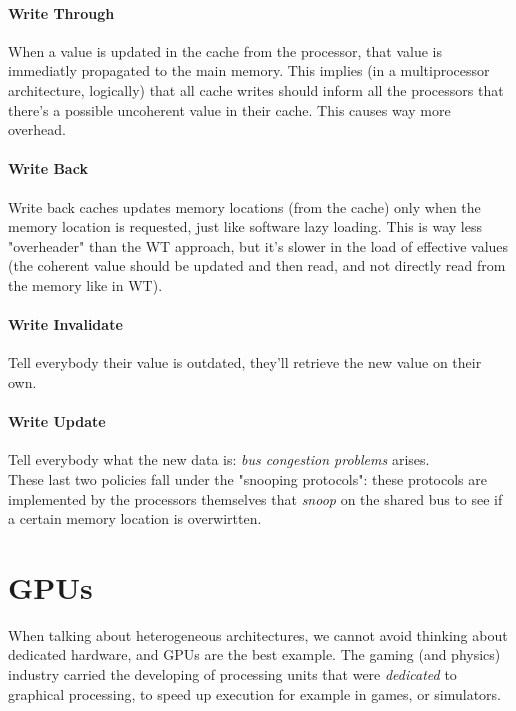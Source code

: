 \documentclass[10pt,a4paper]{article}
\begin{document}
					\paragraph{Write Through}
						When a value is updated in the cache from the processor, that value is immediatly propagated to the main memory. This implies (in a multiprocessor architecture, logically) that all cache writes should inform all the processors that there's a possible uncoherent value in their cache. This causes way more overhead.
						
					\paragraph{Write Back}
						Write back caches updates memory locations (from the cache) only when the memory location is requested, just like software lazy loading. This is way less "overheader" than the WT approach, but it's slower in the load of effective values (the coherent value should be updated and then read, and not directly read from the memory like in WT).
				
					\paragraph{Write Invalidate} 
						Tell everybody their value is outdated, they'll retrieve the new value on their own.
					
					\paragraph{Write Update} 
						Tell everybody what the new data is: \emph{bus congestion problems} arises.\\
						These last two policies fall under the "snooping protocols": these protocols are implemented by the processors themselves that \emph{snoop} on the shared bus to see if a certain memory location is overwirtten. 
					
				
				
		\section{GPUs}
			When talking about heterogeneous architectures, we cannot avoid thinking about dedicated hardware, and GPUs are the best example. The gaming (and physics) industry carried the developing of processing units that were \emph{dedicated} to graphical processing, to speed up execution for example in games, or simulators.
			
\end{document}
